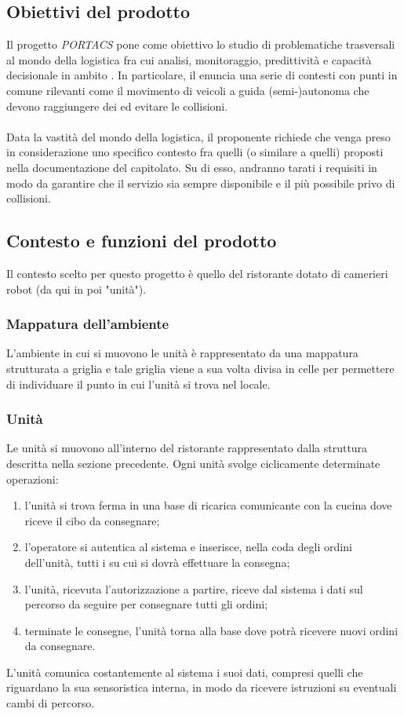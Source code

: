 \subsection{Obiettivi del prodotto}
Il progetto \textit{PORTACS} pone come obiettivo lo studio di problematiche trasversali al mondo della logistica fra cui analisi, monitoraggio, predittività e capacità decisionale in ambito . In particolare, il  enuncia una serie di contesti con punti in comune rilevanti come il movimento di veicoli a guida (semi-)autonoma che devono raggiungere dei  ed evitare le collisioni.
\\\\
Data la vastità del mondo della logistica, il proponente richiede che venga preso in considerazione uno specifico contesto fra quelli (o similare a quelli) proposti nella documentazione del capitolato. Su di esso, andranno tarati i requisiti in modo da garantire che il servizio sia sempre disponibile e il più possibile privo di collisioni.

\subsection{Contesto e funzioni del prodotto}
Il contesto scelto per questo progetto è quello del ristorante dotato di camerieri robot (da qui in poi "unità").
	\subsubsection{Mappatura dell'ambiente}    
    L'ambiente in cui si muovono le unità è rappresentato da una mappatura strutturata a griglia e tale griglia viene a sua volta divisa in celle per permettere di individuare il punto in cui l'unità si trova nel locale.
    \subsubsection{Unità}
    Le unità si muovono all'interno del ristorante rappresentato dalla struttura descritta nella sezione precedente. Ogni unità svolge ciclicamente determinate operazioni:
    \begin{enumerate}
        \item l'unità si trova ferma in una base di ricarica comunicante con la cucina dove riceve il cibo da consegnare;
        \item l'operatore si autentica al sistema e inserisce, nella coda degli ordini dell'unità, tutti i  su cui si dovrà effettuare la consegna;
        \item l'unità, ricevuta l'autorizzazione a partire, riceve dal sistema i dati sul percorso da seguire per consegnare tutti gli ordini;
        \item terminate le consegne, l'unità torna alla base dove potrà ricevere nuovi ordini da consegnare.
    \end{enumerate}
    L'unità comunica costantemente al sistema i suoi dati, compresi quelli che riguardano la sua sensoristica interna, in modo da ricevere istruzioni su eventuali cambi di percorso.


